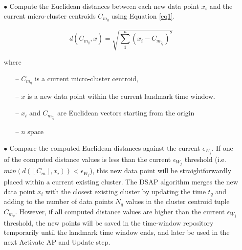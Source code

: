 \begin{itemize}
    \item[$\bullet$] Compute the Euclidean distances between each new data point $x_i$ and the current micro-cluster centroids $C_{m_q}$ using Equation \ref{eq1}.
    
    \begin{equation}
    d\left( C_{m_q},x \right)   = \sqrt { \sum_{1}^{n} \left( x_{i} - C_{m_{q_i}}\right)^2} \label{eq1}
    \end{equation}

    where
    \begin{itemize}
        \item[--] $C_{m_q}$ is a current micro-cluster centroid,
        \item[--] $x$ is a new data point within the current landmark time window.
        \item[--] $x_{i}$ and $C_{m_{q_i}}$ are Euclidean vectors starting from the origin
        \item[--] $n$ space
    \end{itemize}
     
    


    \item[$\bullet$] Compare the computed Euclidean distances against the current $\epsilon_{W_j}$. If one of the computed distance values is less than the current $\epsilon_{W_j}$ threshold (i.e. $min(d([C_{m}],x_i)) < \epsilon_{W_j}$), this new data point will be straightforwardly placed within a current existing cluster. The DSAP algorithm merges the new data point $x_i$ with the closest existing cluster by updating  the time $t_q$ and adding to the number of data points $N_q$ values in the cluster centroid tuple $C_{m_q}$. However, if all computed distance values are higher than the current $\epsilon_{W_j}$ threshold, the new points will be saved in the time-window repository temporarily until the landmark time window ends, and later be used in the next Activate AP and Update step.    
\end{itemize}

